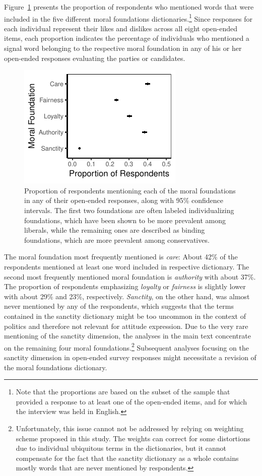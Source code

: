 \documentclass[12pt]{article}
\begin{document}
Figure~\ref{fig:prop_ideol} presents the proportion of respondents who mentioned words that were included in the five different moral foundations dictionaries.\footnote{Note that the proportions are based on the subset of the sample that provided a response to at least one of the open-ended items, and for which the interview was held in English.} Since responses for each individual represent their likes and dislikes across all eight open-ended items, each proportion indicates the percentage of individuals who mentioned a signal word belonging to the respective moral foundation in any of his or her open-ended responses evaluating the parties or candidates.

\begin{figure}[ht]\centering
\includegraphics{../calc/fig/prop_mft.pdf}
\caption{Proportion of respondents mentioning each of the moral foundations in any of their open-ended responses, along with 95\% confidence intervals. The first two foundations are often labeled individualizing foundations, which have been shown to be more prevalent among liberals, while the remaining ones are described as binding foundations, which are more prevalent among conservatives.}\label{fig:prop_ideol}
\end{figure}

The moral foundation most frequently mentioned is \textit{care}: About 42\% of the respondents mentioned at least one word included in respective dictionary. The second most frequently mentioned moral foundation is \textit{authority} with about 37\%. The proportion of respondents emphasizing \textit{loyalty} or \textit{fairness} is slightly lower with about 29\% and 23\%, respectively. \textit{Sanctity}, on the other hand, was almost never mentioned by any of the respondents, which suggests that the terms contained in the sanctity dictionary might be too uncommon in the context of politics and therefore not relevant for attitude expression. Due to the very rare mentioning of the sanctity dimension, the analyses in the main text concentrate on the remaining four moral foundations.\footnote{Unfortunately, this issue cannot not be addressed by relying on weighting scheme proposed in this study. The weights can correct for some distortions due to individual ubiquitous terms in the dictionaries, but it cannot compensate for the fact that the sanctity dictionary as a whole contains mostly words that are never mentioned by respondents.} Subsequent analyses focusing on the sanctity dimension in open-ended survey responses might necessitate a revision of the moral foundations dictionary.
\end{document}
